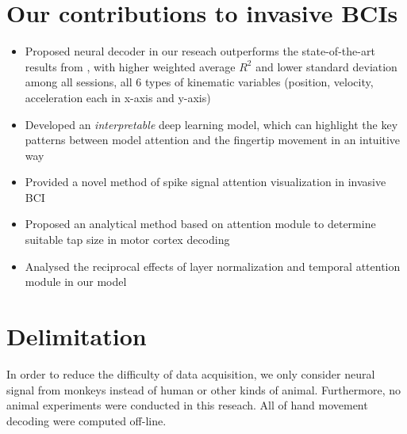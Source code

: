 
\section{Our contributions to invasive BCIs}
\label{sec:our_contributions}
\begin{itemize}
    \item Proposed neural decoder in our reseach outperforms the state-of-the-art results from \cite{makin2018}, with higher weighted average $R^{2}$ and lower standard deviation among all sessions, all 6 types of kinematic variables (position, velocity, acceleration each in x-axis and y-axis)
    \item Developed an \textit{interpretable} deep learning model, which can highlight the key patterns between model attention and the fingertip movement in an intuitive way
    \item Provided a novel method of spike signal attention visualization in invasive BCI
    \item Proposed an analytical method based on attention module to determine suitable tap size in motor cortex decoding
    \item Analysed the reciprocal effects of layer normalization and temporal attention module in our model
\end{itemize}

\section{Delimitation}
\label{sec:delimitation}
In order to reduce the difficulty of data acquisition, we only consider neural signal from monkeys instead of human or other kinds of animal. 
Furthermore, no animal experiments were conducted in this reseach. All of hand movement decoding were computed off-line.
